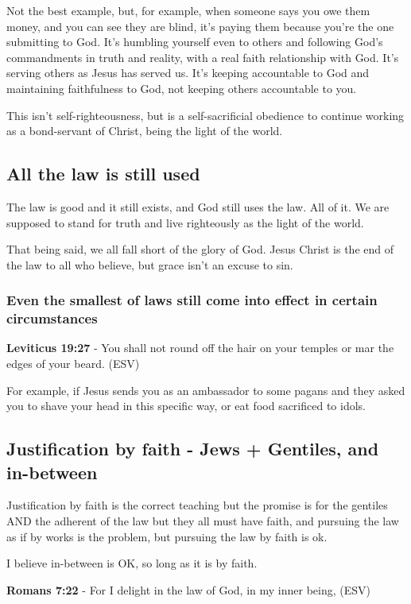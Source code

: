\documentclass[11pt]{article}
\begin{document}
Not the best example, but, for example, when someone says you owe them money, and you can see they are blind, it's paying them because you're the one submitting to God.
It's humbling yourself even to others and following God's commandments in truth and reality, with a real faith relationship with God.
It's serving others as Jesus has served us.
It's keeping accountable to God and maintaining faithfulness to God, not keeping others accountable to you.

This isn't self-righteousness, but is a self-sacrificial obedience to continue working as a bond-servant of Christ, being the light of the world.

\subsection{All the law is still used}
\label{sec:orgd0c818e}
The law is good and it still exists, and God still uses the law. All of it. We are supposed to stand for truth and live righteously as the light of the world.

That being said, we all fall short of the glory of God.
Jesus Christ is the end of the law to all who believe, but grace isn't an excuse to sin.

\subsubsection{Even the smallest of laws still come into effect in certain circumstances}
\label{sec:orgc4d08c3}

\textbf{Leviticus 19:27} - You shall not round off the hair on your temples or mar the edges of your beard. (ESV)

For example, if Jesus sends you as an ambassador to some pagans and they asked you to shave your head in this specific way, or eat food sacrificed to idols.

\subsection{Justification by faith - Jews + Gentiles, and in-between}
\label{sec:orgb4f4ba8}
Justification by faith is the correct teaching but the promise is for the gentiles AND the adherent of the law but they all must have faith, and pursuing the law as if by works is the problem, but pursuing the law by faith is ok.

I believe in-between is OK, so long as it is by faith.

\textbf{Romans 7:22} - For I delight in the law of God, in my inner being, (ESV)
\end{document}
